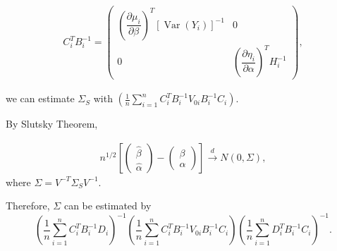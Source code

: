 \documentclass[UTF8,a4paper,10pt]{article}
\begin{document}
\begin{equation*}
  \begin{aligned}
    C_{i}^{T} B_{i}^{-1} = \begin{pmatrix}
      \left(\dfrac{\partial \mu_{i}}{\partial \beta}\right)^{T}[\operatorname{Var}(Y_i)]^{-1}
      & 0\\ 
      0
      & \left(\dfrac{\partial \eta_{i}}{\partial \alpha}\right)^{T} H_{i}^{-1}
    \end{pmatrix},
  \end{aligned}
\end{equation*}

we can estimate \(\Sigma_S\) with \(\left(\frac{1}{n} \sum_{i=1}^{n} C_{i}^{T} B_{i}^{-1} V_{0 i} B_{i}^{-1} C_{i}\right)\).

By Slutsky Theorem,

\begin{equation*}
  \begin{aligned}
    n^{1/2}\left[\left(\begin{array}{l}\hat{\beta} \\ \hat{\alpha}\end{array}\right)-\left(\begin{array}{c}\beta \\ \alpha\end{array}\right)\right] \xrightarrow{d} N(0,\Sigma),
  \end{aligned}
\end{equation*}
where \(\Sigma = V^{-T}\Sigma_S V^{-1}\).

Therefore, $\Sigma$ can be estimated by 
\[\left(\frac{1}{n} \sum_{i=1}^{n} C_{i}^{T} B_{i}^{-1} D_{i}\right)^{-1}\left(\frac{1}{n} \sum_{i=1}^{n} C_{i}^{T} B_{i}^{-1} V_{0 i} B_{i}^{-1} C_{i}\right)\left(\frac{1}{n} \sum_{i=1}^{n} D_{i}^{T} B_{i}^{-1} C_{i}\right)^{-1}.\]





\end{document}
